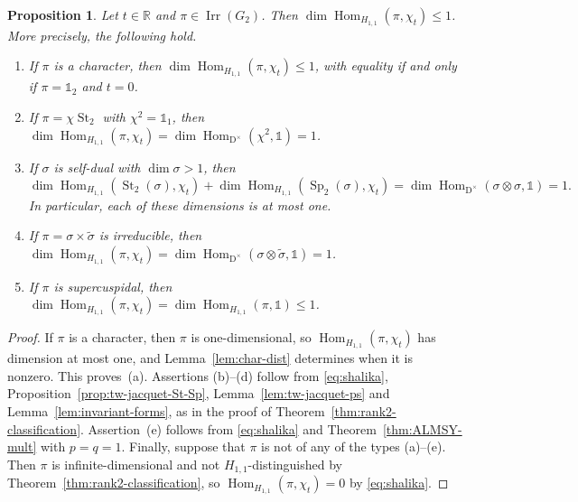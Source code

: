 \documentclass[11pt]{amsart}
\numberwithin{equation}{section}
\theoremstyle{plain}
\newtheorem{proposition}[theorem]{Proposition}
\theoremstyle{definition}
\theoremstyle{remark}
\newcommand{\R}{\mathbb{R}}
\newcommand{\one}{\mathds{1}}
\DeclareMathOperator{\Hom}{Hom}
\DeclareMathOperator{\Irr}{Irr}
\DeclareMathOperator{\St}{St}
\DeclareMathOperator{\Sp}{Sp}
\begin{document}
\begin{proposition}\label{prop:rank2-mult}
	Let $t\in\R$ and $\pi\in\Irr(G_2)$. Then $\dim\Hom_{H_{1,1}}(\pi,\chi_t)\le1$. More precisely, the following hold.
	\begin{enumerate}[label=\textup{(\alph*)}]
		\item If $\pi$ is a character, then $\dim\Hom_{H_{1,1}}(\pi,\chi_t)\le1$, with equality if and only if $\pi=\one_2$ and $t=0$.
		\item If $\pi=\chi\St_2$ with $\chi^2=\one_1$, then $\dim\Hom_{H_{1,1}}(\pi,\chi_t)=\dim\Hom_{\mathrm{D}^\times}(\chi^2,\one)=1$.
		\item If $\sigma$ is self-dual with $\dim\sigma>1$, then
		$$\dim\Hom_{H_{1,1}}(\St_2(\sigma),\chi_t)+\dim\Hom_{H_{1,1}}(\Sp_2(\sigma),\chi_t)=\dim\Hom_{\mathrm{D}^\times}(\sigma\otimes\sigma,\one)=1.$$
		In particular, each of these dimensions is at most one.
		\item If $\pi=\sigma\times\widetilde\sigma$ is irreducible, then $\dim\Hom_{H_{1,1}}(\pi,\chi_t)=\dim\Hom_{\mathrm{D}^\times}(\sigma\otimes\widetilde\sigma,\one)=1$.
		\item If $\pi$ is supercuspidal, then $\dim\Hom_{H_{1,1}}(\pi,\chi_t)=\dim\Hom_{H_{1,1}}(\pi,\one)\le1$.
	\end{enumerate}
\end{proposition}

\begin{proof}
	If $\pi$ is a character, then $\pi$ is one-dimensional, so $\Hom_{H_{1,1}}(\pi,\chi_t)$ has dimension at most one, and Lemma~\ref{lem:char-dist} determines when it is nonzero. This proves~(a). Assertions (b)--(d) follow from \eqref{eq:shalika}, Proposition~\ref{prop:tw-jacquet-St-Sp}, Lemma~\ref{lem:tw-jacquet-ps} and Lemma~\ref{lem:invariant-forms}, as in the proof of Theorem~\ref{thm:rank2-classification}. Assertion~(e) follows from \eqref{eq:shalika} and Theorem~\ref{thm:ALMSY-mult} with $p=q=1$. Finally, suppose that $\pi$ is not of any of the types (a)--(e). Then $\pi$ is infinite-dimensional and not $H_{1,1}$-distinguished by Theorem~\ref{thm:rank2-classification}, so $\Hom_{H_{1,1}}(\pi,\chi_t)=0$ by \eqref{eq:shalika}.
\end{proof}
\end{document}
